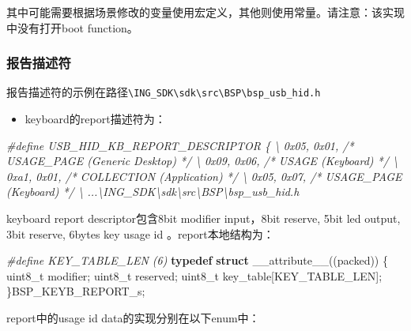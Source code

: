 \documentclass[
  12pt,
]{book}
\newenvironment{Shaded}{\begin{snugshade}}{\end{snugshade}}
\newcommand{\DataTypeTok}[1]{\textcolor[rgb]{0.13,0.29,0.53}{#1}}
\newcommand{\KeywordTok}[1]{\textcolor[rgb]{0.13,0.29,0.53}{\textbf{#1}}}
\newcommand{\NormalTok}[1]{#1}
\newcommand{\PreprocessorTok}[1]{\textcolor[rgb]{0.56,0.35,0.01}{\textit{#1}}}
\providecommand{\tightlist}{%
  \setlength{\itemsep}{0pt}\setlength{\parskip}{0pt}}
\begin{document}
其中可能需要根据场景修改的变量使用宏定义，其他则使用常量。请注意：该实现中没有打开boot function。

\hypertarget{ux62a5ux544aux63cfux8ff0ux7b26}{%
\subsubsection{报告描述符}\label{ux62a5ux544aux63cfux8ff0ux7b26}}

报告描述符的示例在路径\texttt{\textbackslash{}ING\_SDK\textbackslash{}sdk\textbackslash{}src\textbackslash{}BSP\textbackslash{}bsp\_usb\_hid.h}

\begin{itemize}
\tightlist
\item
  keyboard的report描述符为：
\end{itemize}

\begin{Shaded}
\begin{Highlighting}[]
\PreprocessorTok{#define USB_HID_KB_REPORT_DESCRIPTOR \{  \textbackslash{}}
\PreprocessorTok{    0x05, 0x01, /* USAGE_PAGE (Generic Desktop)                       */  \textbackslash{}}
\PreprocessorTok{    0x09, 0x06, /* USAGE (Keyboard)                                   */  \textbackslash{}}
\PreprocessorTok{    0xa1, 0x01, /* COLLECTION (Application)                           */  \textbackslash{}}
\PreprocessorTok{    0x05, 0x07, /*   USAGE_PAGE (Keyboard)                            */  \textbackslash{}}
\PreprocessorTok{    ...\textbackslash{}ING_SDK\textbackslash{}sdk\textbackslash{}src\textbackslash{}BSP\textbackslash{}bsp_usb_hid.h}
\end{Highlighting}
\end{Shaded}

keyboard report descriptor包含8bit modifier input，8bit reserve, 5bit led output, 3bit reserve, 6bytes key usage id 。report本地结构为：

\begin{Shaded}
\begin{Highlighting}[]
\PreprocessorTok{#define KEY_TABLE_LEN (6)}
\KeywordTok{typedef} \KeywordTok{struct}\NormalTok{ __attribute__((packed))}
\NormalTok{\{}
  \DataTypeTok{uint8_t}\NormalTok{ modifier;}
  \DataTypeTok{uint8_t}\NormalTok{ reserved;}
  \DataTypeTok{uint8_t}\NormalTok{ key_table[KEY_TABLE_LEN];}
\NormalTok{\}BSP_KEYB_REPORT_s;}
\end{Highlighting}
\end{Shaded}

report中的usage id data的实现分别在以下enum中：
\end{document}
